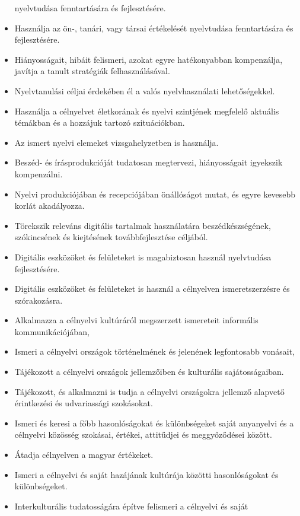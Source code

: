\begin{itemize}
  nyelvtudása fenntartására és fejlesztésére.
\item
  Használja az ön-, tanári, vagy társai értékelését nyelvtudása
  fenntartására és fejlesztésére.
\item
  Hiányosságait, hibáit felismeri, azokat egyre hatékonyabban
  kompenzálja, javítja a tanult stratégiák felhasználásával.
\item
  Nyelvtanulási céljai érdekében él a valós nyelvhasználati
  lehetőségekkel.
\item
  Használja a célnyelvet életkorának és nyelvi szintjének megfelelő
  aktuális témákban és a hozzájuk tartozó szituációkban.
\item
  Az ismert nyelvi elemeket vizsgahelyzetben is használja.
\item
  Beszéd- és írásprodukcióját tudatosan megtervezi, hiányosságait
  igyekszik kompenzálni.
\item
  Nyelvi produkciójában és recepciójában önállóságot mutat, és egyre
  kevesebb korlát akadályozza.
\item
  Törekszik releváns digitális tartalmak használatára beszédkészségének,
  szókincsének és kiejtésének továbbfejlesztése céljából.
\item
  Digitális eszközöket és felületeket is magabiztosan használ
  nyelvtudása fejlesztésére.
\item
  Digitális eszközöket és felületeket is használ a célnyelven
  ismeretszerzésre és szórakozásra.
\item
  Alkalmazza a célnyelvi kultúráról megszerzett ismereteit informális
  kommunikációjában,
\item
  Ismeri a célnyelvi országok történelmének és jelenének legfontosabb
  vonásait,
\item
  Tájékozott a célnyelvi országok jellemzőiben és kulturális
  sajátosságaiban.
\item
  Tájékozott, és alkalmazni is tudja a célnyelvi országokra jellemző
  alapvető érintkezési és udvariassági szokásokat.
\item
  Ismeri és keresi a főbb hasonlóságokat és különbségeket saját
  anyanyelvi és a célnyelvi közösség szokásai, értékei, attitűdjei és
  meggyőződései között.
\item
  Átadja célnyelven a magyar értékeket.
\item
  Ismeri a célnyelvi és saját hazájának kultúrája közötti hasonlóságokat
  és különbségeket.
\item
  Interkulturális tudatosságára építve felismeri a célnyelvi és saját

\end{itemize}
